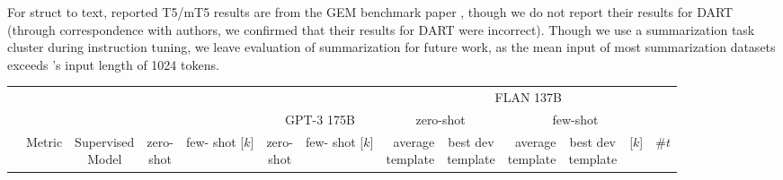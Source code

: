 For struct to text, reported T5/mT5 results are from the GEM benchmark paper \citep{gehrmann2021gem}, though we do not report their results for DART (through correspondence with authors, we confirmed that their results for DART were incorrect). 
Though we use a summarization task cluster during instruction tuning, we leave evaluation of summarization for future work, as the mean input of most summarization datasets exceeds \flan's input length of 1024 tokens.

\begingroup
\setlength{\tabcolsep}{1.5pt}
\newcommand{\centerme}[1]{\multicolumn{1}{c}{#1}}
\newcommand{\centermewithrightbar}[1]{\multicolumn{1}{c|}{#1}}
\begin{table}[h]
    \centering
    \small
    \begin{tabular}{l lc cl cl rc rc lc}
    \toprule
     & & & & & & & \multicolumn{6}{c}{FLAN 137B} \\
     \cmidrule(lr){8-13}
     & & & \multicolumn{2}{c}{\baselm{}} &  \multicolumn{2}{c}{GPT-3 175B} & \multicolumn{2}{c}{zero-shot} & \multicolumn{3}{c}{few-shot}\\
     \cmidrule(lr){4-5} \cmidrule(lr){6-7} \cmidrule(lr){8-9} \cmidrule(lr){10-12}
     & Metric & \makecell[c]{\scriptsize Supervised\vspace{-0.6mm}\\\scriptsize Model} & \makecell[c]{zero-\vspace{-0.6mm}\\ shot} & \makecell[c]{few-\vspace{-0.6mm}\\ shot {\tiny [$k$]}} & \makecell[c]{zero-\vspace{-0.6mm}\\ shot} & \makecell[c]{few-\vspace{-0.6mm}\\ shot {\tiny [$k$]}} & \makecell[c]{\scriptsize average \vspace{-0.6mm}\\ \scriptsize template}  & \makecell[c]{\scriptsize best dev \vspace{-0.6mm}\\ \scriptsize template} &  \makecell[c]{\scriptsize average \vspace{-0.6mm}\\ \scriptsize template}  & \makecell[c]{\scriptsize best dev \vspace{-0.6mm}\\ \scriptsize template} & {\tiny [$k$]} & {\scriptsize \#$t$} \\

\end{tabular}
\end{table}
